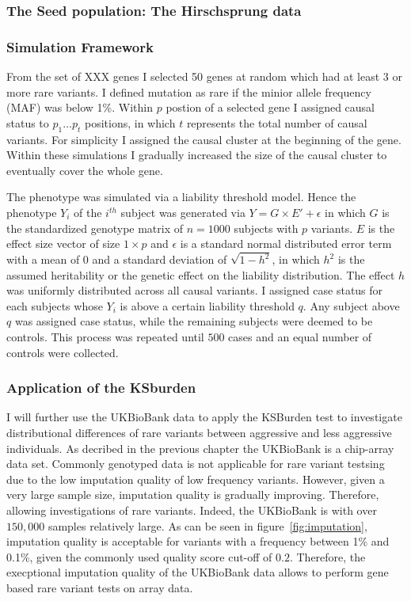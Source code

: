 \subsubsection{The Seed population: The Hirschsprung data}
\label{ssub:The_Seed_population:_The_Hirschsprung_data}

\subsubsection{Simulation Framework}
\label{ssub:Simulation_Framework}

From the set of XXX genes I selected 50 genes at random which had at least 3 or more rare variants. 
I defined mutation as rare if the minior allele frequency (MAF) was below 1\%. 
Within $p$ postion of a selected gene I assigned causal status to $p_1 \ldots p_t$ positions, in which $t$ represents the total number of causal variants.
For simplicity I assigned the causal cluster at the beginning of the gene.
Within these simulations I gradually increased the size of the causal cluster to eventually cover the whole gene. 

The phenotype was simulated via a liability threshold model.
Hence the phenotype $Y_i$ of the $i^{th}$ subject was generated via
$Y = G\times E' + \epsilon$
in which $G$ is the standardized genotype matrix of $n=1000$ subjects with $p$ variants.
$E$ is the effect size vector of size $1\times p$ and $\epsilon$ is a standard normal distributed error term with a mean of $0$ and a standard deviation of $\sqrt{1-h^2}$, in which $h^2$ is the assumed heritability or the genetic effect on the liability distribution.
The effect $h$ was uniformly distributed across all causal variants.
I assigned case status for each subjects whose $Y_i$ is above a certain liability threshold $q$.
Any subject above $q$ was assigned case status, while the remaining subjects were deemed to be controls.
This process was repeated until $500$ cases and an equal number of controls were collected.

\subsubsection{Application of the KSburden}
\label{ssub:Application_of_the_KSburden}

I will further use the UKBioBank data to apply the KSBurden test to investigate distributional differences of rare variants between aggressive and less aggressive individuals.
As decribed in the previous chapter the UKBioBank is a chip-array data set.
Commonly genotyped data is not applicable for rare variant testsing due to the low imputation quality of low frequency variants.
However, given a very large sample size, imputation quality is gradually improving.
Therefore, allowing investigations of rare variants.
Indeed, the UKBioBank is with over $150,000$ samples relatively large.
As can be seen in figure~\ref{fig:imputation}, imputation quality is acceptable for variants with a frequency between 1\% and 0.1\%, given the commonly used quality score cut-off of $0.2$.
Therefore, the execptional imputation quality of the UKBioBank data allows to perform gene based rare variant tests on array data.

